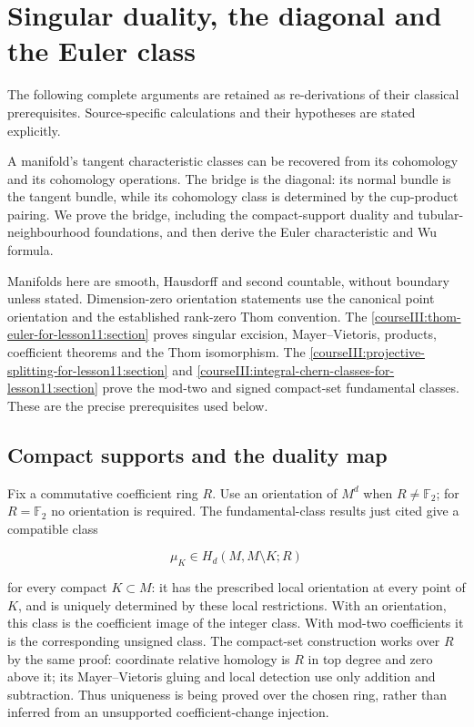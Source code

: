 \section{Singular duality, the diagonal and the Euler class}\label{courseIII:manifold-duality-the-diagonal-and-wu-classes.source:section}

The following complete arguments are retained as re-derivations of their classical prerequisites. Source-specific calculations and their hypotheses are stated explicitly.

A manifold's tangent characteristic classes can be recovered from its cohomology and its cohomology operations. The bridge is the diagonal: its normal bundle is the tangent bundle, while its cohomology class is determined by the cup-product pairing. We prove the bridge, including the compact-support duality and tubular-neighbourhood foundations, and then derive the Euler characteristic and Wu formula.

Manifolds here are smooth, Hausdorff and second countable, without boundary unless stated. Dimension-zero orientation statements use the canonical point orientation and the established rank-zero Thom convention. The \cref{courseIII:thom-euler-for-lesson11:section} proves singular excision, Mayer--Vietoris, products, coefficient theorems and the Thom isomorphism. The \cref{courseIII:projective-splitting-for-lesson11:section} and \cref{courseIII:integral-chern-classes-for-lesson11:section} prove the mod-two and signed compact-set fundamental classes. These are the precise prerequisites used below.

\subsection{Compact supports and the duality map}
\label{courseIII:manifold-duality-the-diagonal-and-wu-classes.source:section-1}

Fix a commutative coefficient ring \(R\). Use an orientation of \(M^d\) when \(R\ne\mathbb F _2\); for \(R=\mathbb F _2\) no orientation is required. The fundamental-class results just cited give a compatible class

\[
\mu_K\in H_d(M,M\setminus K;R)
\]

for every compact \(K\subset M\): it has the prescribed local orientation at every point of \(K\), and is uniquely determined by these local restrictions. With an orientation, this class is the coefficient image of the integer class. With mod-two coefficients it is the corresponding unsigned class. The compact-set construction works over \(R\) by the same proof: coordinate relative homology is \(R\) in top degree and zero above it; its Mayer--Vietoris gluing and local detection use only addition and subtraction. Thus uniqueness is being proved over the chosen ring, rather than inferred from an unsupported coefficient-change injection.

